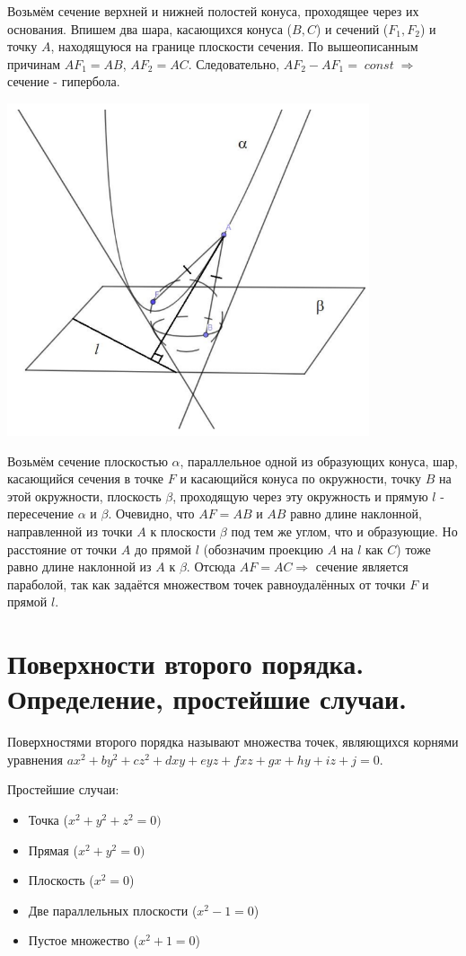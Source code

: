 \documentclass[12pt]{article}
\DeclareMathOperator{\const}{\textit{const}}
\begin{document}
\begin{sloppypar}
    Возьмём сечение верхней и нижней полостей конуса, проходящее через их основания. Впишем два шара, касающихся конуса ($B, C$) и сечений ($F_1, F_2$) и точку $A$, находящуюся на границе плоскости сечения. По вышеописанным причинам $AF_1 = AB$, $AF_2 = AC$. Следовательно, $AF_2 - AF_1 = \const \Rightarrow$ сечение - гипербола.

    \includegraphics[width=0.8\textwidth]{graphics/Конус_парабола.png}

    Возьмём сечение плоскостью $\alpha$, параллельное одной из образующих конуса, шар, касающийся сечения в точке $F$ и касающийся конуса по окружности, точку $B$ на этой окружности, плоскость $\beta$, проходящую через эту окружность и прямую $l$ - пересечение $\alpha$ и $\beta$. Очевидно, что $AF = AB$ и $AB$ равно длине наклонной, направленной из точки $A$ к плоскости $\beta$ под тем же углом, что и образующие. Но расстояние от точки $A$ до прямой $l$ (обозначим проекцию $A$ на $l$ как $C$) тоже равно длине наклонной из $A$ к $\beta$. Отсюда $AF = AC \Rightarrow$ сечение является параболой, так как задаётся множеством точек равноудалённых от точки $F$ и прямой $l$.

    \section{Поверхности второго порядка. Определение, простейшие случаи.}
    Поверхностями второго порядка называют множества точек, являющихся корнями уравнения $ax^2 + by^2 + cz^2 + dxy + eyz + fxz + gx + hy + iz + j = 0$.

    Простейшие случаи:
    \begin{itemize}
        \item Точка ($x^2 + y^2 + z^2 = 0)$
        \item Прямая ($x^2 + y^2 = 0)$
        \item Плоскость ($x^2 = 0$)
        \item Две параллельных плоскости ($x^2 - 1 = 0$)
        \item Пустое множество ($x^2 + 1 = 0$)
    \end{itemize}


\end{sloppypar}
\end{document}
